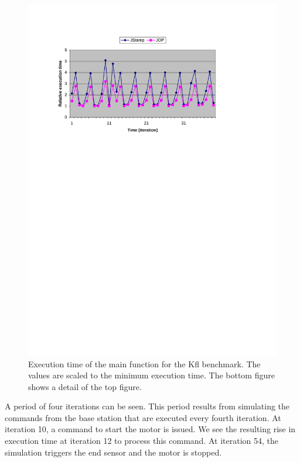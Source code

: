 \begin{figure}
    \includegraphics[width=\excelwidth]{results/results_kfl_exe_detail}
    \caption{Execution time of the main function for the Kfl benchmark.
    The values are scaled to the minimum execution time. The bottom
    figure shows a detail of the top figure.
    }
    \label{fig:results:kfl:exe}
\end{figure}


A period of four iterations can be seen. This period results from
simulating the commands from the base station that are executed
every fourth iteration. At iteration 10, a command to start the
motor is issued. We see the resulting rise in execution time at
iteration 12 to process this command. At iteration 54, the
simulation triggers the end sensor and the motor is stopped.

